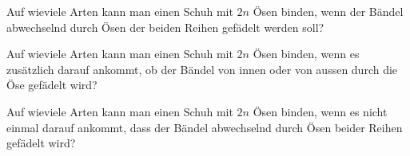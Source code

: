 \begin{center}
\end{center}

\begin{teilaufgaben}
\item
Auf wieviele Arten kann man einen Schuh mit $2n$ Ösen binden, wenn der
Bändel abwechselnd durch Ösen der beiden Reihen gefädelt werden soll?
\item
Auf wieviele Arten kann man einen Schuh mit $2n$ Ösen binden, wenn
es zusätzlich darauf ankommt, ob der Bändel von innen oder von aussen
durch die Öse gefädelt wird?
\item
Auf wieviele Arten kann man einen Schuh mit $2n$ Ösen binden,
wenn es nicht einmal darauf ankommt, dass der Bändel abwechselnd
durch Ösen beider Reihen gefädelt wird?
\end{teilaufgaben}


